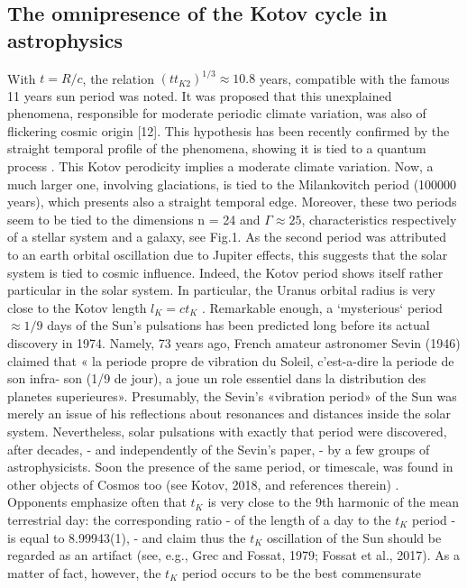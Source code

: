 \documentclass[twoside,draft]{article}
\begin{document}
{\subsection{The omnipresence of the Kotov cycle in astrophysics}

With $t = R/c$, the relation $(t t_{K2} )^{1/3} \approx 10.8$ years, compatible with the famous 11 years sun period
was noted. It was proposed that this unexplained phenomena, responsible for moderate periodic
climate variation, was also of flickering cosmic origin [12]. This hypothesis has been recently
confirmed by the straight temporal profile of the phenomena, showing it is tied to a quantum
process \cite{Kotov}.
This Kotov perodicity implies a moderate climate variation. Now, a much larger one, involving
glaciations, is tied to the Milankovitch period (100000 years), which presents also a straight
temporal edge. Moreover, these two periods seem to be tied to the dimensions n = 24 and $\Gamma \approx 25$,
characteristics respectively of a stellar system and a galaxy, see Fig.1. As the second period was
attributed to an earth orbital oscillation due to Jupiter effects, this suggests that the solar system is
tied to cosmic influence. Indeed, the Kotov period shows itself rather particular in the solar system.
In particular, the Uranus orbital radius is very close to the Kotov length $l_{K} = ct_{K}$ .
Remarkable enough, a `mysterious` period $\approx 1/9$ days of the Sun's pulsations has been predicted
long before its actual discovery in 1974. Namely, 73 years ago, French amateur astronomer Sevin
(1946) claimed that « la periode propre de vibration du Soleil, c'est-a-dire la periode de son infra-
son (1/9 de jour), a joue un role essentiel dans la distribution des planetes superieures». Presumably,
the Sevin's «vibration period» of the Sun was merely an issue of his reflections about resonances
and distances inside the solar system. Nevertheless, solar pulsations with exactly that period were
discovered, after decades, - and independently of the Sevin's paper, - by a few groups of
astrophysicists. Soon the presence of the same period, or timescale, was found in other objects of
Cosmos too (see Kotov, 2018, and references therein) .
Opponents emphasize often that $t_{K}$ is very close to the 9th harmonic of the mean terrestrial day: the corresponding ratio - of the length of a day to the $t_{K}$ period - is equal to 8.99943(1), - and claim
thus the $t_{K}$ oscillation of the Sun should be regarded as an artifact (see, e.g., Grec and Fossat, 1979;
Fossat et al., 2017). As a matter of fact, however, the $t_{K}$ period occurs to be the best commensurate
}
\end{document}
